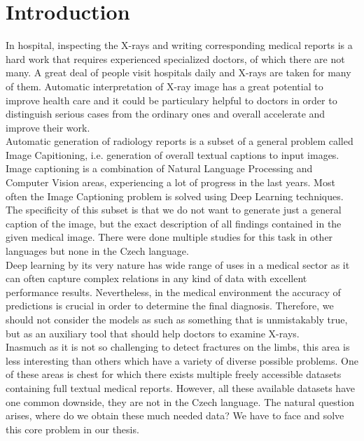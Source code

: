 \chapter*{Introduction}

In hospital, inspecting the X-rays and writing corresponding medical reports is a hard work that requires experienced specialized doctors, of which there are not many. A great deal of people visit hospitals daily and X-rays are taken for many of them. Automatic interpretation of X-ray image has a great potential to improve health care and it could be particulary helpful to doctors in order to distinguish serious cases from the ordinary ones and overall accelerate and improve their work.\\

Automatic generation of radiology reports is a subset of a general problem called Image Capitioning, i.e. generation of overall textual captions to input images. Image captioning is a combination of Natural Language Processing and Computer Vision areas, experiencing a lot of progress in the last years. Most often the Image Captioning problem is solved using Deep Learning techniques. The specificity of this subset is that we do not want to generate just a general caption of the image, but the exact description of all findings contained in the given medical image. There were done multiple studies for this task in other languages but none in the Czech language.\\

Deep learning by its very nature has wide range of uses in a medical sector as it can often capture complex relations in any kind of data with excellent performance results. Nevertheless, in the medical environment the accuracy of predictions is crucial in order to determine the final diagnosis. Therefore, we should not consider the models as such as something that is unmistakably true, but as an auxiliary tool that should help doctors to examine X-rays.\\

Inasmuch as it is not so challenging to detect fractures on the limbs, this area is less interesting than others which have a variety of diverse possible problems. One of these areas is chest for which there exists multiple freely accessible datasets containing full textual medical reports. However, all these available datasets have one common downside, they are not in the Czech language. The natural question arises, where do we obtain these much needed data? We have to face and solve this core problem in our thesis.\\

